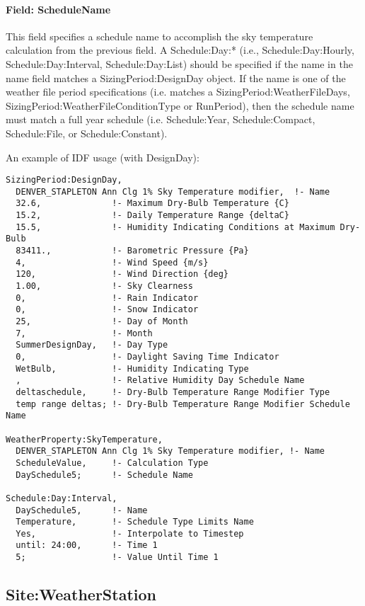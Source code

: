 \paragraph{Field: ScheduleName}\label{field-schedulename}

This field specifies a schedule name to accomplish the sky temperature calculation from the previous field. A Schedule:Day:* (i.e., Schedule:Day:Hourly, Schedule:Day:Interval, Schedule:Day:List) should be specified if the name in the name field matches a SizingPeriod:DesignDay object. If the name is one of the weather file period specifications (i.e. matches a SizingPeriod:WeatherFileDays, SizingPeriod:WeatherFileConditionType or RunPeriod), then the schedule name must match a full year schedule (i.e. Schedule:Year, Schedule:Compact, Schedule:File, or Schedule:Constant).

An example of IDF usage (with DesignDay):

\begin{lstlisting}
SizingPeriod:DesignDay,
  DENVER_STAPLETON Ann Clg 1% Sky Temperature modifier,  !- Name
  32.6,              !- Maximum Dry-Bulb Temperature {C}
  15.2,              !- Daily Temperature Range {deltaC}
  15.5,              !- Humidity Indicating Conditions at Maximum Dry-Bulb
  83411.,            !- Barometric Pressure {Pa}
  4,                 !- Wind Speed {m/s}
  120,               !- Wind Direction {deg}
  1.00,              !- Sky Clearness
  0,                 !- Rain Indicator
  0,                 !- Snow Indicator
  25,                !- Day of Month
  7,                 !- Month
  SummerDesignDay,   !- Day Type
  0,                 !- Daylight Saving Time Indicator
  WetBulb,           !- Humidity Indicating Type
  ,                  !- Relative Humidity Day Schedule Name
  deltaschedule,     !- Dry-Bulb Temperature Range Modifier Type
  temp range deltas; !- Dry-Bulb Temperature Range Modifier Schedule Name

WeatherProperty:SkyTemperature,
  DENVER_STAPLETON Ann Clg 1% Sky Temperature modifier, !- Name
  ScheduleValue,     !- Calculation Type
  DaySchedule5;      !- Schedule Name

Schedule:Day:Interval,
  DaySchedule5,      !- Name
  Temperature,       !- Schedule Type Limits Name
  Yes,               !- Interpolate to Timestep
  until: 24:00,      !- Time 1
  5;                 !- Value Until Time 1
\end{lstlisting}

\subsection{Site:WeatherStation}\label{siteweatherstation}

